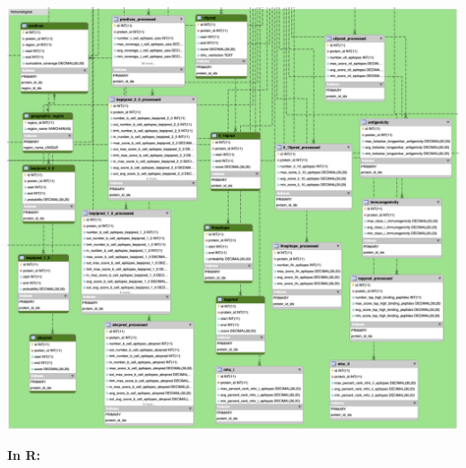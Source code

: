 \documentclass[
  11pt,
  oneside]{book}
\begin{document}
\begin{center}\includegraphics[width=1\linewidth]{./figures/Supplementary Fig 1 immunological data} \end{center}

\textbf{In R: }
\end{document}
